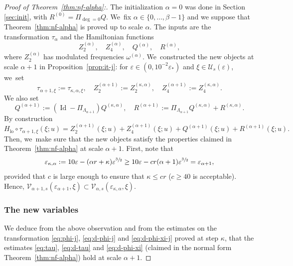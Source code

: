 \documentclass[10pt,a4paper]{amsart}
\theoremstyle{plain}
\theoremstyle{definition}
\DeclareMathOperator{\lo}{lo}
\newcommand{\1}{\mathbf{1}}
\let\epsilon\varepsilon
\begin{document}
\begin{proof}[Proof of Theorem~\ref{thm:nf-alpha}:] The initialization $\alpha=0$ was done in Section \ref{sec:init}, with $R^{(0)}=\Pi_{\deg=0}Q$. We~fix $\alpha\in\{0,\dots,\beta-1\}$ and we suppose that Theorem~\ref{thm:nf-alpha} is proved up to scale $\alpha$. The inputs are the transformation $\tau_{\alpha}$ and the Hamiltonian functions
\[
Z_{2}^{(\alpha)},\quad Z_{4}^{(\alpha)},\quad Q^{(\alpha)},\quad R^{(\alpha)},
\]
where $Z_{2}^{(\alpha)}$ has modulated frequencies $\omega^{(\alpha)}$. We~constructed the new objects at scale $\alpha+1$ in Proposition~\ref{prop:it-j}: for $\epsilon\in(0,10^{-2}\epsilon_{\ast})$ and $\xi\in\mathcal{U}_{s}(\epsilon)$, we~set
\[
\tau_{\alpha+1,\xi}:= \tau_{\kappa,\alpha,\xi},\quad Z_{2}^{(\alpha+1)} := Z_{2}^{(\kappa,\alpha)},\quad Z_{4}^{(\alpha+1)} := Z_{4}^{(\kappa,\alpha)}.
\]
We also set
\[
Q^{(\alpha+1)} :=(\operatorname{Id}- \Pi_{\Lambda_{\alpha+1}})Q^{(\kappa,\alpha)},
\quad
R^{(\alpha+1)} := \Pi_{\Lambda_{\alpha+1}}Q^{(\kappa,\alpha)}
+ R^{(\kappa,\alpha)}.
\]
By construction
\[
H_{\lo}\circ\tau_{\alpha+1,\xi}(\xi;u) =
Z_{2}^{(\alpha+1)}(\xi;u)
+ Z_{4}^{(\alpha+1)}(\xi;u)
+ Q^{(\alpha+1)}(\xi;u)
+R^{(\alpha+1)}(\xi;u).
\]
Then, we~make sure that the new objects satisfy the properties claimed in Theorem~\ref{thm:nf-alpha} at scale $\alpha+1$. First, note that
\[
\epsilon_{\kappa,\alpha} := 10\epsilon - (\alpha r + \kappa)\epsilon^{\sfrac{3}{2}}
\geq
10\epsilon - cr(\alpha+1)\epsilon^{\sfrac{3}{2}}
=\epsilon_{\alpha+1},
\]
provided that $c$ is large enough to ensure that $\kappa\leq cr$ ($c\geq40$ is acceptable). Hence, $\mathcal{V}_{\alpha+1,s}(\epsilon_{\alpha+1},\xi) \subset \mathcal{V}_{\alpha,s}(\epsilon_{\kappa,\alpha},\xi)$.

\subsubsection*{The new variables} We deduce from the above observation and from the estimates on the transformation \eqref{eq:phi-j}, \eqref{eq:d-phi-j} and \eqref{eq:d-phi-xi-j} proved at step $\kappa$, that the estimates \eqref{eq:tau}, \eqref{eq:d-tau} and \eqref{eq:d-phi-xi} (claimed in the normal form Theorem~\ref{thm:nf-alpha}) hold at scale $\alpha+1$.


\end{proof}
\end{document}
